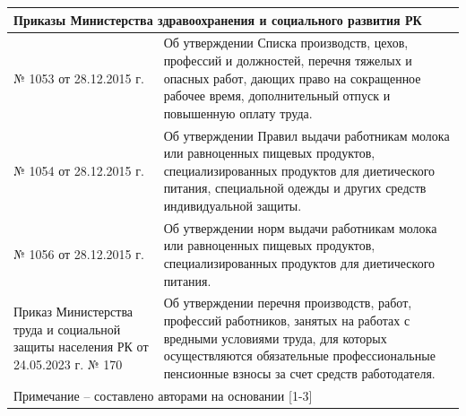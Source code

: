 \begin{longtable}[c]{|lp{}|}
\multicolumn{2}{|p{0.4\textwidth}|}{Приказы Министерства здравоохранения и социального развития РК} \\ \hline
\multicolumn{1}{|p{0.4\textwidth}|}{№ 1053 от 28.12.2015 г.} &
  Об утверждении Списка производств, цехов, профессий и должностей, перечня тяжелых и опасных работ, дающих право на сокращенное рабочее время, дополнительный отпуск и повышенную оплату труда. \\ \hline
\multicolumn{1}{|p{0.4\textwidth}|}{№ 1054 от 28.12.2015 г.} &
  Об утверждении Правил выдачи работникам молока или равноценных пищевых продуктов, специализированных продуктов для диетического питания, специальной одежды и других средств индивидуальной защиты. \\ \hline
\multicolumn{1}{|p{0.4\textwidth}|}{№ 1056 от 28.12.2015 г.} &
  Об утверждении норм выдачи работникам молока или равноценных пищевых продуктов, специализированных продуктов для диетического питания. \\ \hline
\multicolumn{1}{|p{0.4\textwidth}|}{Приказ Министерства труда и социальной защиты населения РК от 24.05.2023 г. № 170} &
  Об утверждении перечня производств, работ, профессий работников, занятых на работах с вредными условиями труда, для которых осуществляются обязательные профессиональные пенсионные взносы за счет средств работодателя. \\ \hline
\multicolumn{2}{|p{0.4\textwidth}|}{Примечание – составлено авторами на основании {[}1-3{]}} \\ \hline
\end{longtable}

